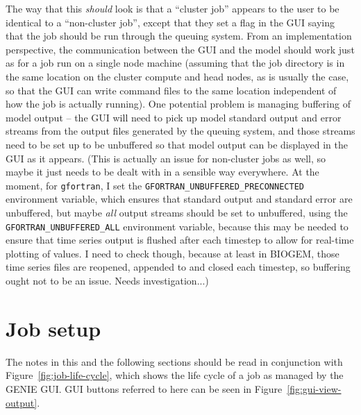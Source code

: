 \documentclass[a4paper,11pt,article]{memoir}
\begin{document}
The way that this \emph{should} look is that a ``cluster job'' appears
to the user to be identical to a ``non-cluster job'', except that they
set a flag in the GUI saying that the job should be run through the
queuing system.  From an implementation perspective, the communication
between the GUI and the model should work just as for a job run on a
single node machine (assuming that the job directory is in the same
location on the cluster compute and head nodes, as is usually the
case, so that the GUI can write command files to the same location
independent of how the job is actually running).  One potential
problem is managing buffering of model output -- the GUI will need to
pick up model standard output and error streams from the output files
generated by the queuing system, and those streams need to be set up
to be unbuffered so that model output can be displayed in the GUI as
it appears.  (This is actually an issue for non-cluster jobs as well,
so maybe it just needs to be dealt with in a sensible way everywhere.
At the moment, for \texttt{gfortran}, I set the
\texttt{GFORTRAN\_UNBUFFERED\_PRECONNECTED} environment variable,
which ensures that standard output and standard error are unbuffered,
but maybe \emph{all} output streams should be set to unbuffered, using
the \texttt{GFORTRAN\_UNBUFFERED\_ALL} environment variable, because
this may be needed to ensure that time series output is flushed after
each timestep to allow for real-time plotting of values.  I need to
check though, because at least in BIOGEM, those time series files are
reopened, appended to and closed each timestep, so buffering ought not
to be an issue.  Needs investigation...)

\section{Job setup}

The notes in this and the following sections should be read in
conjunction with Figure~\ref{fig:job-life-cycle}, which shows the life
cycle of a job as managed by the GENIE GUI.  GUI buttons referred to
here can be seen in Figure~\ref{fig:gui-view-output}.
\end{document}

